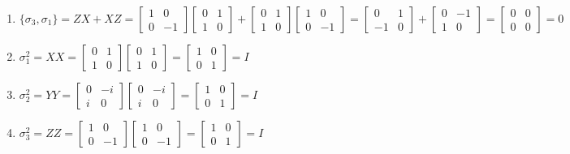 \documentclass{article}
\begin{document}
\begin{framed}
\begin{enumerate}
        \item $\{\sigma_3, \sigma_1\} = ZX + XZ = \begin{bmatrix}1 & 0 \\ 0 & -1\end{bmatrix} \begin{bmatrix}0 & 1 \\ 1 & 0\end{bmatrix} + \begin{bmatrix}0 & 1 \\ 1 & 0\end{bmatrix} \begin{bmatrix}1 & 0 \\ 0 & -1\end{bmatrix} = \begin{bmatrix}0 & 1 \\ -1 & 0\end{bmatrix} + \begin{bmatrix}0 & -1 \\ 1 & 0\end{bmatrix} = \begin{bmatrix}0 & 0 \\ 0 & 0\end{bmatrix} = 0$
        \item $\sigma_1^2  = XX= \begin{bmatrix}0 & 1 \\ 1 & 0\end{bmatrix} \begin{bmatrix}0 & 1 \\ 1 & 0\end{bmatrix} = \begin{bmatrix}1 & 0 \\ 0 & 1\end{bmatrix} = I$
        \item $\sigma_2^2  = YY= \begin{bmatrix}0 & -i \\ i & 0\end{bmatrix} \begin{bmatrix}0 & -i \\ i & 0\end{bmatrix} = \begin{bmatrix}1 & 0 \\ 0 & 1\end{bmatrix} = I$
        \item $\sigma_3^2  = ZZ= \begin{bmatrix}1 & 0 \\ 0 & -1\end{bmatrix} \begin{bmatrix}1 & 0 \\ 0 & -1\end{bmatrix} = \begin{bmatrix}1 & 0 \\ 0 & 1\end{bmatrix} = I$


    \end{enumerate}
    
\end{framed}
\end{document}
